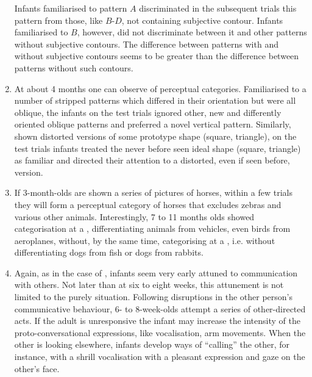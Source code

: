 \begin{enumerate}
\begin{center}
\epsfxsize=12cm
\end{center}
Infants familiarised to pattern $A$ discriminated in the subsequent trials this
pattern from those, like $B$-$D$, not containing subjective contour.  Infants
familiarised to $B$, however, did not discriminate between it and other patterns
without subjective contours. The difference between patterns with and without
subjective contours seems to be greater than the difference between patterns
without such contours.
\item At about 4 months one can observe  of perceptual
  categories. Familiarised to a number of stripped patterns which differed in
  their orientation but were all oblique, the infants on the test trials
  ignored other, new and differently oriented oblique patterns and preferred a
  novel vertical pattern. Similarly, shown distorted versions
  of some prototype shape (square, triangle), on the test trials infants treated
  the never before seen ideal shape (square, triangle) as familiar and directed
  their attention to a distorted, even if seen before, version.
\item If 3-month-olds are shown a series of pictures of horses, within a few
  trials they will form a perceptual category of horses that excludes zebras and
  various other animals. Interestingly, 7 to 11 months olds
  showed categorisation at a , differentiating animals from
  vehicles, even birds from aeroplanes, without, by the same time, categorising
  at a , i.e. without differentiating dogs from fish or
  dogs from rabbits.
\item Again, as in the case of , infants seem very early 
  attuned to communication with others.  Not later than at six to eight weeks,
  this attunement is not limited to the purely  situation.  Following
  disruptions in the other person's communicative behaviour, 6- to 8-week-olds
  attempt a series of other-directed acts. If the adult is unresponsive the
  infant may increase the intensity of the proto-conversational expressions,
  like vocalisation, arm movements. When the other is looking elsewhere, infants
  develop ways of ``calling'' the other, for instance, with a shrill
  vocalisation with a pleasant expression and gaze on the other's
  face.
\end{enumerate}

